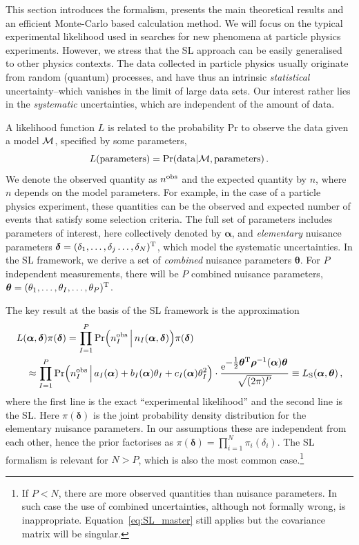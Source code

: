 \documentclass[11pt]{article}
\newcommand{\be}{\begin{equation}}
\newcommand{\ee}{\end{equation}}
\begin{document}
This section introduces the formalism, presents the main theoretical results and an efficient Monte-Carlo based calculation method. We will focus on the typical experimental likelihood used in searches for new phenomena at particle physics experiments. However, we stress that the SL approach can be easily generalised to other physics contexts.
The data collected in particle physics usually originate from random (quantum) processes, and have thus an intrinsic \textit{statistical} uncertainty--which vanishes in the limit of large data sets. Our interest rather lies in the \textit{systematic} uncertainties, which are independent of the amount of data.


A likelihood function $L$ is related to the probability Pr to observe the data given a model $\cal M$, specified by some parameters,
\be L({\rm parameters})={\rm Pr}({\rm data}|{\cal M},{\rm parameters})\,.\ee
We denote the observed  quantity as $n^{\rm obs}$ and the expected quantity by $n$, where $n$ depends on the model parameters.   For example, in the case of
a particle physics experiment, these quantities can be the observed and expected number of events that satisfy some selection criteria.
The full set of parameters includes parameters of interest, here collectively denoted by $\bm{\alpha}$, and \textit{elementary} nuisance parameters $\bm{\delta}=(\delta_1,\ldots,\delta_{j}\ldots,\delta_N)^{\rm{T}}$, which model the systematic uncertainties.
In the SL framework, we derive a set of \textit{combined} nuisance parameters $\bm{\theta}$. For $P$ independent measurements, there will be $P$ combined nuisance parameters, $\bm{\theta}=(\theta_1,\ldots,\theta_{I},\ldots,\theta_P)^{\rm{T}}$.


The key result at the basis of  the SL framework is the approximation
\begin{align}
  & L(\bm{\alpha},\bm{\delta} )\pi(\bm{\delta})
   = \prod_{I=1}^P \mathrm{Pr}\Big(  n^{\rm obs}_I\,\Big|\,n_I(\bm{\alpha},\bm{\delta})  \Big) \pi(\bm{\delta}) \label{eq:EL} \\
  & \quad \approx \prod_{I=1}^P \mathrm{Pr}\Big( n^{\rm obs}_I\,\Big|\,a_{I}(\bm \alpha)+b_I(\bm \alpha)\theta_I+c_I(\bm \alpha)\theta_I^2  \Big) \cdot
    \frac{ \mathrm{e}^{{\textstyle-\frac{1}{2}\bm \theta^{\rm T} \bm{\rho}^{-1}(\bm \alpha) \bm \theta}}}{\sqrt{(2\pi)^P }}  \equiv L_{\rm{S}}(\bm{\alpha},\bm{\theta})\,, \label{eq:SL_master}
\end{align}
where the first line is the exact ``experimental likelihood'' and the second line is the SL. Here $\pi(\bm \delta)$ is the joint probability density distribution for the elementary nuisance parameters. In our assumptions  these are independent from each other, hence the prior factorises as $\pi(\bm \delta)=\prod_{i=1}^N \pi_i(\delta_i)$. The SL formalism  is relevant for $N>P$, which is also the most common case.\footnote{If $P<N$, there are more observed quantities than nuisance parameters.
 In such case the use of combined uncertainties, although not formally wrong, is inappropriate.
  Equation~\eqref{eq:SL_master} still applies but the covariance matrix will be singular.
}
\end{document}
